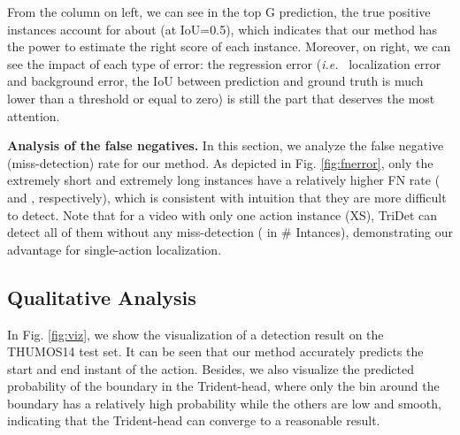 \documentclass[10pt,twocolumn,letterpaper]{article}
\def\ie{{\em i.e.}}
\newcommand{\figref}[1]{Fig. \ref{#1}}
\newcommand{\myPara}[1]{\vspace{.05in}\noindent\textbf{#1}}
\begin{document}
From the  column on left, we can see in the top G prediction, the true positive instances account for about  (at IoU=0.5), which indicates that our method has the power to estimate the right score of each instance. Moreover, on right, we can see the impact of each type of error: the regression error (\ie~ localization error and background error, the IoU between prediction and ground truth is much lower than a threshold or equal to zero) is still the part that deserves the most attention. 


\myPara{Analysis of the false negatives.}
In this section, we analyze the false negative (miss-detection) rate for our method. As depicted in \figref{fig:fnerror}, only the extremely short and extremely long instances have a relatively higher FN rate ( and , respectively), which is consistent with intuition that they are more difficult to detect. Note that for a video with only one action instance (XS), TriDet can detect all of them without any miss-detection ( in \# Intances), demonstrating our advantage for single-action localization.


\begin{figure*}[t]
\end{figure*}

\subsection{Qualitative Analysis}
In \figref{fig:viz}, we show the visualization of a detection result on the THUMOS14 test set. It can be seen that our method accurately predicts the start and end instant of the action. Besides, we also visualize the predicted probability of the boundary in the Trident-head, where only the bin around the boundary has a relatively high probability while the others are low and smooth, indicating that the Trident-head can converge to a reasonable result.
\end{document}
